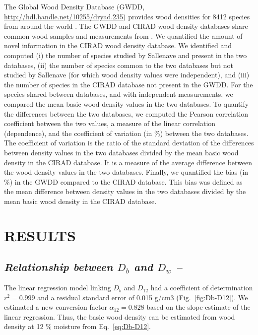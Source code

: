 \documentclass[a4paper, 12pt, leqno, dvipsnames]{article}\usepackage[]{graphicx}\usepackage[]{color}
\begin{document}
The Global Wood Density Database (GWDD, \url{http://hdl.handle.net/10255/dryad.235}) provides wood densities for 8412 species from around the world \citep{Chave2009, Zanne2009}. The GWDD and CIRAD wood density databases share common wood samples and measurements from \citet{Sallenave1955, Sallenave1964, Sallenave1971}. We quantified the amount of novel information in the CIRAD wood density database. We identified and computed (i) the number of species studied by Sallenave and present in the two databases, (ii) the number of species common to the two databases but not studied by Sallenave (for which wood density values were independent), and (iii) the number of species in the CIRAD database not present in the GWDD. For the species shared between databases, and with independent measurements, we compared the mean basic wood density values in the two databases. To quantify the differences between the two databases, we computed the Pearson correlation coefficient between the two values, a measure of the linear correlation (dependence), and the coefficient of variation (in \%) between the two databases. The coefficient of variation is the ratio of the standard deviation of the differences between density values in the two databases divided by the mean basic wood density in the CIRAD database. It is a measure of the average difference between the wood density values in the two databases. Finally, we quantified the bias (in \%) in the GWDD compared to the CIRAD database. This bias was defined as the mean difference between density values in the two databases divided by the mean basic wood density in the CIRAD database. 

\newpage

\section*{RESULTS}

\subsection*{\textit{Relationship between $D_b$ and $D_w$ --}}

The linear regression model linking $D_b$ and $D_{12}$ had a coefficient of determination $r^2=0.999$ and a residual standard error of 0.015 g/cm$3$ (Fig.~\ref{fig:Db-D12}). We estimated a new conversion factor $\alpha_{12}=0.828$ based on the slope estimate of the linear regression. Thus, the basic wood density can be estimated from wood density at 12 \% moisture from Eq.~\ref{eq:Db-D12}.
\end{document}

